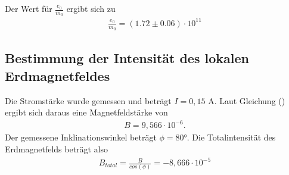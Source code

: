 Der Wert für $\frac{e_0}{m_0}$ ergibt sich zu
\begin{align*}
\frac{e_0}{m_0} = (1.72 \pm 0.06) \cdot 10^{11}
\end{align*}


\subsection{Bestimmung der Intensität des lokalen Erdmagnetfeldes}
Die Stromstärke wurde gemessen und beträgt $I = 0,15$ \si{\ampere}.
Laut Gleichung () ergibt sich daraus eine Magnetfeldstärke von
\begin{align*}
    B = 9,566 \cdot 10^{-6} .
\end{align*}
Der gemessene Inklinationswinkel beträgt $\phi = 80°$.
Die Totalintensität des Erdmagnetfelds beträgt also
\begin{align*}
    B_{total} = \frac{B}{cos(\phi)} = -8,666 \cdot 10^{-5}
\end{align*}
